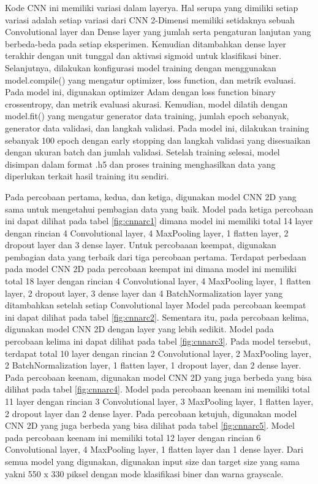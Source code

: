 Kode CNN ini memiliki variasi dalam layerya. Hal serupa yang dimiliki setiap variasi adalah setiap variasi dari CNN 2-Dimensi memiliki setidaknya sebuah Convolutional layer dan Dense layer yang jumlah serta pengaturan lanjutan yang berbeda-beda pada setiap eksperimen. Kemudian ditambahkan dense layer terakhir dengan unit tunggal dan aktivasi sigmoid untuk klasifikasi biner. Selanjutnya, dilakukan konfigurasi model training dengan menggunakan model.compile() yang mengatur optimizer, loss function, dan metrik evaluasi. Pada model ini, digunakan optimizer Adam dengan loss function binary crossentropy, dan metrik evaluasi akurasi. Kemudian, model dilatih dengan model.fit() yang mengatur generator data training, jumlah epoch sebanyak, generator data validasi, dan langkah validasi. Pada model ini, dilakukan training sebanyak 100 epoch dengan early stopping dan langkah validasi yang disesuaikan dengan ukuran batch dan jumlah validasi. Setelah training selesai, model disimpan dalam format .h5 dan proses training menghasilkan data yang diperlukan terkait hasil training itu sendiri.

Pada percobaan pertama, kedua, dan ketiga, digunakan model CNN 2D yang sama untuk mengetahui pembagian data yang baik. Model pada ketiga percobaan ini dapat dilihat pada tabel \ref{fig:cnnarc1} dimana model ini memiliki total 14 layer dengan rincian 4 Convolutional layer, 4 MaxPooling layer, 1 flatten layer, 2 dropout layer dan 3 dense layer. Untuk percobaaan keempat, digunakan pembagian data yang terbaik dari tiga percobaan pertama. Terdapat perbedaan pada model CNN 2D pada percobaan keempat ini dimana model ini memiliki total 18 layer dengan rincian 4 Convolutional layer, 4 MaxPooling layer, 1 flatten layer, 2 dropout layer, 3 dense layer dan 4 BatchNormalization layer yang ditambahkan setelah setiap Convolutional layer Model pada percobaan keempat ini dapat dilihat pada tabel \ref{fig:cnnarc2}. Sementara itu, pada percobaan kelima, digunakan model CNN 2D dengan layer yang lebih sedikit. Model pada percobaan kelima ini dapat dilihat pada tabel \ref{fig:cnnarc3}. Pada model tersebut, terdapat total 10 layer dengan rincian 2 Convolutional layer, 2 MaxPooling layer, 2 BatchNormalization layer, 1 flatten layer, 1 dropout layer, dan 2 dense layer. Pada percobaan keenam, digunakan model CNN 2D yang juga berbeda yang bisa dilihat pada tabel \ref{fig:cnnarc4}. Model pada percobaan keenam ini memiliki total 11 layer dengan rincian 3 Convolutional layer, 3 MaxPooling layer, 1 flatten layer, 2 dropout layer dan 2 dense layer. Pada percobaan ketujuh, digunakan model CNN 2D yang juga berbeda yang bisa dilihat pada tabel \ref{fig:cnnarc5}. Model pada percobaan keenam ini memiliki total 12 layer dengan rincian 6 Convolutional layer, 4 MaxPooling layer, 1 flatten layer dan 1 dense layer. Dari semua model yang digunakan, digunakan input size dan target size yang sama yakni 550 x 330 piksel dengan mode klasifikasi biner dan warna grayscale.

